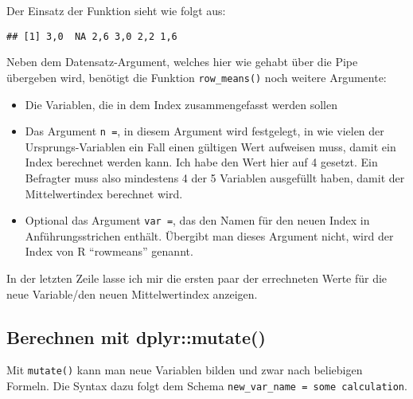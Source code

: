 \documentclass[
]{book}
\newenvironment{Shaded}{\begin{snugshade}}{\end{snugshade}}
\newcommand{\AttributeTok}[1]{\textcolor[rgb]{0.77,0.63,0.00}{#1}}
\newcommand{\DecValTok}[1]{\textcolor[rgb]{0.00,0.00,0.81}{#1}}
\newcommand{\FunctionTok}[1]{\textcolor[rgb]{0.00,0.00,0.00}{#1}}
\newcommand{\NormalTok}[1]{#1}
\newcommand{\OtherTok}[1]{\textcolor[rgb]{0.56,0.35,0.01}{#1}}
\newcommand{\SpecialCharTok}[1]{\textcolor[rgb]{0.00,0.00,0.00}{#1}}
\newcommand{\StringTok}[1]{\textcolor[rgb]{0.31,0.60,0.02}{#1}}
\begin{document}
Der Einsatz der Funktion sieht wie folgt aus:

\begin{Shaded}
\end{Shaded}

\begin{verbatim}
## [1] 3,0  NA 2,6 3,0 2,2 1,6
\end{verbatim}

Neben dem Datensatz-Argument, welches hier wie gehabt über die Pipe übergeben wird, benötigt die Funktion \texttt{row\_means()} noch weitere Argumente:

\begin{itemize}
\item
  Die Variablen, die in dem Index zusammengefasst werden sollen
\item
  Das Argument \texttt{n\ =}, in diesem Argument wird festgelegt, in wie vielen der Ursprungs-Variablen ein Fall einen gültigen Wert aufweisen muss, damit ein Index berechnet werden kann. Ich habe den Wert hier auf 4 gesetzt. Ein Befragter muss also mindestens 4 der 5 Variablen ausgefüllt haben, damit der Mittelwertindex berechnet wird.
\item
  Optional das Argument \texttt{var\ =}, das den Namen für den neuen Index in Anführungsstrichen enthält. Übergibt man dieses Argument nicht, wird der Index von R ``rowmeans'' genannt.
\end{itemize}

In der letzten Zeile lasse ich mir die ersten paar der errechneten Werte für die neue Variable/den neuen Mittelwertindex anzeigen.

\hypertarget{berechnen-mit-dplyrmutate}{%
\subsection{Berechnen mit dplyr::mutate()}\label{berechnen-mit-dplyrmutate}}

Mit \texttt{mutate()} kann man neue Variablen bilden und zwar nach beliebigen Formeln. Die Syntax dazu folgt dem Schema \texttt{new\_var\_name\ =\ some\ calculation}.
\end{document}
